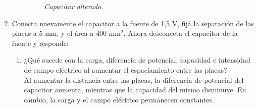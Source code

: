 \documentclass[12pt]{report}
\begin{document}
\begin{enumerate}
\begin{enumerate}
\begin{figure}[h]
\begin{minipage}[h]{0.4\textwidth}
          \textit{Capacitor alterado.} 
       \end{minipage}
      \end{figure}

            \vspace{10cm}

        
    \end{enumerate}
    \item Conecta nuevamente el capacitor a la fuente de 1,5 V, fijá la separación de las placas a 5 mm, y el área a 400 mm$^2$. Ahora desconecta el capacitor de la fuente y responde:
    \begin{enumerate}
        \item ¿Qué sucede con la carga, diferencia de potencial, capacidad e intensidad de campo eléctrico al aumentar el espaciamiento entre las placas?\\[6pt]
        Al aumentar la distancia entre las placas, la diferencia de potencial del capacitor aumenta, mientras que la capacidad del mismo disminuye. En cambio, la carga  y el campo eléctrico permanecen constantes.\\


\end{enumerate}
\end{enumerate}
\end{document}
